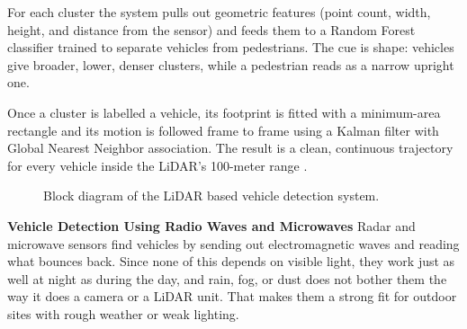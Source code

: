 ﻿\documentclass[11pt, a4paper]{report}
\begin{document}
For each cluster the system pulls out geometric features (point count, width, height, and distance from the sensor) and feeds them to a Random Forest classifier trained to separate vehicles from pedestrians. The cue is shape: vehicles give broader, lower, denser clusters, while a pedestrian reads as a narrow upright one.

Once a cluster is labelled a vehicle, its footprint is fitted with a minimum-area rectangle and its motion is followed frame to frame using a Kalman filter with Global Nearest Neighbor association. The result is a clean, continuous trajectory for every vehicle inside the LiDAR's 100-meter range \cite{lv2019lidar}.

\begin{figure}[H]
\begin{center}
\end{center}
\caption{Block diagram of the LiDAR based vehicle detection system.}
\label{fig:lidar_detection}
\end{figure}

\textbf{Vehicle Detection Using Radio Waves and Microwaves}
Radar and microwave sensors find vehicles by sending out electromagnetic waves and reading what bounces back. Since none of this depends on visible light, they work just as well at night as during the day, and rain, fog, or dust does not bother them the way it does a camera or a LiDAR unit. That makes them a strong fit for outdoor sites with rough weather or weak lighting.
\end{document}
